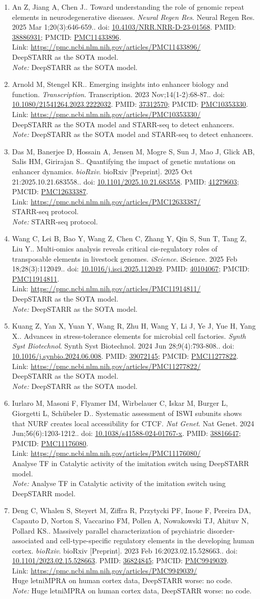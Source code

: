 \documentclass[12pt]{article}
\newcommand{\Pub}[9]{%
  \item #1. #2. \textit{#3}. #4. doi: \href{https://doi.org/#5}{#5}. PMID: \href{https://pubmed.ncbi.nlm.nih.gov/#6/}{#6}; PMCID: \href{https://www.ncbi.nlm.nih.gov/pmc/articles/#7/}{#7}. \\
  \noindent Link: \url{#8}\\
  \ifx#9\relax\else\\\textit{Note:} #9\fi
}
\begin{document}
\begin{enumerate}[leftmargin=*,label=\textbf{\arabic*.}]
\Pub{An Z, Jiang A, Chen J.}{Toward understanding the role of genomic repeat elements in neurodegenerative diseases}{Neural Regen Res}{Neural Regen Res. 2025 Mar 1;20(3):646-659.}{10.4103/NRR.NRR-D-23-01568}{38886931}{PMC11433896}{https://pmc.ncbi.nlm.nih.gov/articles/PMC11433896/}{DeepSTARR as the SOTA model.}

\Pub{Arnold M, Stengel KR.}{Emerging insights into enhancer biology and function}{Transcription}{Transcription. 2023 Nov;14(1-2):68-87.}{10.1080/21541264.2023.2222032}{37312570}{PMC10353330}{https://pmc.ncbi.nlm.nih.gov/articles/PMC10353330/}{DeepSTARR as the SOTA model and STARR-seq to detect enhancers.}

\Pub{Das M, Banerjee D, Hossain A, Jensen M, Mogre S, Sun J, Mao J, Glick AB, Salis HM, Girirajan S.}{Quantifying the impact of genetic mutations on enhancer dynamics}{bioRxiv}{bioRxiv [Preprint]. 2025 Oct 21:2025.10.21.683558.}{10.1101/2025.10.21.683558}{41279603}{PMC12633387}{https://pmc.ncbi.nlm.nih.gov/articles/PMC12633387/}{STARR-seq protocol.}

\Pub{Wang C, Lei B, Bao Y, Wang Z, Chen C, Zhang Y, Qin S, Sun T, Tang Z, Liu Y.}{Multi-omics analysis reveals critical cis-regulatory roles of transposable elements in livestock genomes}{iScience}{iScience. 2025 Feb 18;28(3):112049.}{10.1016/j.isci.2025.112049}{40104067}{PMC11914811}{https://pmc.ncbi.nlm.nih.gov/articles/PMC11914811/}{DeepSTARR as the SOTA model.}

\Pub{Kuang Z, Yan X, Yuan Y, Wang R, Zhu H, Wang Y, Li J, Ye J, Yue H, Yang X.}{Advances in stress-tolerance elements for microbial cell factories}{Synth Syst Biotechnol}{Synth Syst Biotechnol. 2024 Jun 28;9(4):793-808.}{10.1016/j.synbio.2024.06.008}{39072145}{PMC11277822}{https://pmc.ncbi.nlm.nih.gov/articles/PMC11277822/}{DeepSTARR as the SOTA model.}

\Pub{Iurlaro M, Masoni F, Flyamer IM, Wirbelauer C, Iskar M, Burger L, Giorgetti L, Schübeler D.}{Systematic assessment of ISWI subunits shows that NURF creates local accessibility for CTCF}{Nat Genet}{Nat Genet. 2024 Jun;56(6):1203-1212.}{10.1038/s41588-024-01767-x}{38816647}{PMC11176080}{https://pmc.ncbi.nlm.nih.gov/articles/PMC11176080/}{Analyse TF in Catalytic activity of the imitation switch using DeepSTARR model.}

\Pub{Deng C, Whalen S, Steyert M, Ziffra R, Przytycki PF, Inoue F, Pereira DA, Capauto D, Norton S, Vaccarino FM, Pollen A, Nowakowski TJ, Ahituv N, Pollard KS.}{Massively parallel characterization of psychiatric disorder-associated and cell-type-specific regulatory elements in the developing human cortex}{bioRxiv}{bioRxiv [Preprint]. 2023 Feb 16:2023.02.15.528663.}{10.1101/2023.02.15.528663}{36824845}{PMC9949039}{https://pmc.ncbi.nlm.nih.gov/articles/PMC9949039/}{Huge letniMPRA on human cortex data, DeepSTARR worse: no code.}


\end{enumerate}
\end{document}
